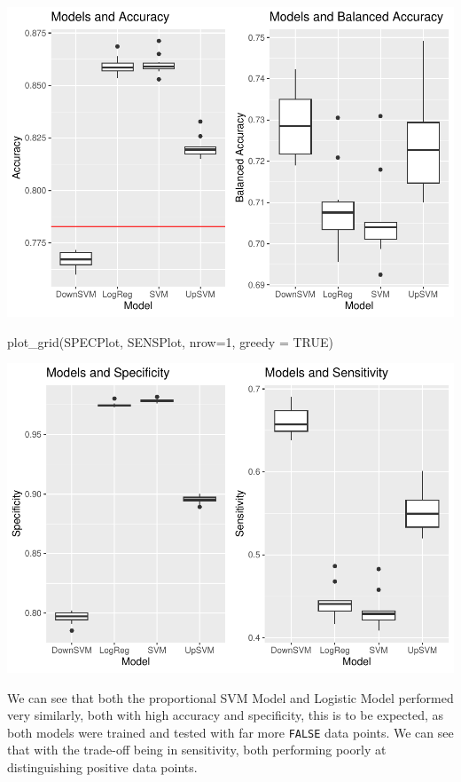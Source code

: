 \documentclass[
]{article}
\newenvironment{Shaded}{\begin{snugshade}}{\end{snugshade}}
\newcommand{\AttributeTok}[1]{\textcolor[rgb]{0.77,0.63,0.00}{#1}}
\newcommand{\ConstantTok}[1]{\textcolor[rgb]{0.00,0.00,0.00}{#1}}
\newcommand{\DecValTok}[1]{\textcolor[rgb]{0.00,0.00,0.81}{#1}}
\newcommand{\FunctionTok}[1]{\textcolor[rgb]{0.00,0.00,0.00}{#1}}
\newcommand{\NormalTok}[1]{#1}
\begin{document}
\includegraphics{rahil_notebook_files/figure-latex/unnamed-chunk-20-1.pdf}

\begin{Shaded}
\begin{Highlighting}[]
\FunctionTok{plot\_grid}\NormalTok{(SPECPlot, SENSPlot, }\AttributeTok{nrow=}\DecValTok{1}\NormalTok{, }\AttributeTok{greedy =} \ConstantTok{TRUE}\NormalTok{)}
\end{Highlighting}
\end{Shaded}

\includegraphics{rahil_notebook_files/figure-latex/unnamed-chunk-20-2.pdf}

We can see that both the proportional SVM Model and Logistic Model
performed very similarly, both with high accuracy and specificity, this
is to be expected, as both models were trained and tested with far more
\texttt{FALSE} data points. We can see that with the trade-off being in
sensitivity, both performing poorly at distinguishing positive data
points.
\end{document}
